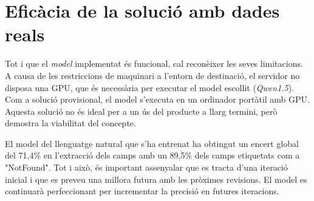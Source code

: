 \section{Eficàcia de la solució amb dades reals}

Tot i que el \textit{model} implementat és funcional, cal reconèixer les seves limitacions. A causa de les restriccions de maquinari a l'entorn de destinació, el servidor no disposa una GPU, que és necessària per executar el model escollit (\textit{Qwen1.5}). Com a solució provisional, el model s'executa en un ordinador portàtil amb GPU. Aquesta solució no és ideal per a un ús del producte a llarg termini, però demostra la viabilitat del concepte.

El model del llenguatge natural que s'ha entrenat ha obtingut un encert global del 71,4\% en l'extracció dels camps amb un 89,5\% dels camps etiquetats com a "NotFound". Tot i això, és important assenyalar que es tracta d'una iteració inicial i que es preveu una millora futura amb les pròximes revisions. El model es continuarà perfeccionant per incrementar la precisió en futures iteracions.
